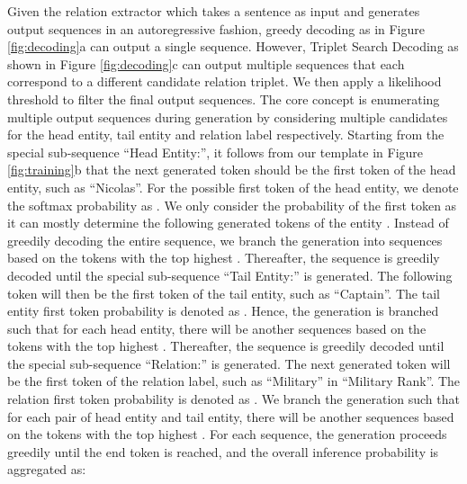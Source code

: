 \documentclass[11pt]{article}
\begin{document}
Given the relation extractor which takes a sentence as input and generates output sequences in an autoregressive fashion, greedy decoding as in Figure \ref{fig:decoding}a can output a single sequence. 
However, Triplet Search Decoding as shown in Figure \ref{fig:decoding}c can output multiple sequences that each correspond to a different candidate relation triplet. 
We then apply a likelihood threshold to filter the final output sequences.
The core concept is enumerating multiple output sequences during generation by considering multiple candidates for the head entity, tail entity and relation label respectively.
Starting from the special sub-sequence ``Head Entity:'', it follows from our template in Figure \ref{fig:training}b that the next generated token should be the first token of the head entity, such as ``Nicolas''. 
For the  possible first token of the head entity, we denote the softmax probability as .
We only consider the probability of the first token as it can mostly determine the following generated tokens of the entity \cite{Zhao2021Calibrate}. 
Instead of greedily decoding the entire sequence, we branch the generation into  sequences based on the tokens with the top  highest .
Thereafter, the sequence is greedily decoded until the special sub-sequence ``Tail Entity:'' is generated. 
The following token will then be the first token of the tail entity, such as ``Captain''.
The  tail entity first token probability is denoted as .
Hence, the generation is branched such that for each head entity, there will be another  sequences based on the tokens with the top  highest .
Thereafter, the sequence is greedily decoded until the special sub-sequence ``Relation:'' is generated. 
The next generated token will be the first token of the relation label, such as ``Military'' in ``Military Rank''.
The  relation first token probability is denoted as .
We branch the generation such that for each pair of head entity and tail entity, there will be another  sequences based on the tokens with the top  highest .
For each sequence, the generation proceeds greedily until the end token is reached, and the overall inference probability is aggregated as:
\end{document}
